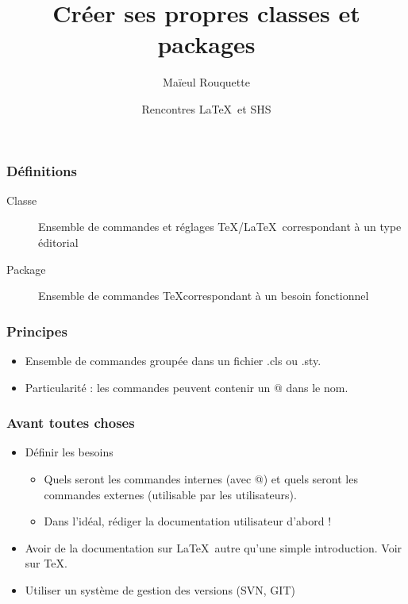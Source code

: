 \documentclass{beamer}
\author{Maïeul Rouquette}
\date{Rencontres \LaTeX\ et SHS}
\title{Créer ses propres classes et packages}
\institute{Université de Lausanne --- IRSB}
\begin{document}
%

\begin{frame}
	\frametitle{Définitions}
	\begin{description}
		\item[Classe]Ensemble de commandes et réglages \TeX/\LaTeX\ correspondant à un type éditorial
		\item[Package]Ensemble de commandes \TeX correspondant à un besoin fonctionnel
	\end{description}
\end{frame}

\begin{frame}
	\frametitle{Principes}
	\begin{itemize}
		\item<1->Ensemble de commandes groupée dans un fichier .cls ou .sty.
		\item<2->Particularité : les commandes peuvent contenir un @ dans le nom.
	\end{itemize}
\end{frame}

\begin{frame}
	\frametitle{Avant toutes choses}
	\begin{itemize}
		\item<1->Définir les besoins
			\begin{itemize}
				\item<2->Quels seront les commandes internes (avec @) et quels seront les commandes externes (utilisable par les utilisateurs).
				\item<3->Dans l'idéal, rédiger la documentation utilisateur d'abord !
			\end{itemize}
		\item<4->Avoir de la documentation sur \LaTeX\ autre qu'une simple introduction. Voir sur \TeX.
		\item<5->Utiliser un système de gestion des versions (SVN, GIT)
	\end{itemize}
\end{frame}
\end{document}
